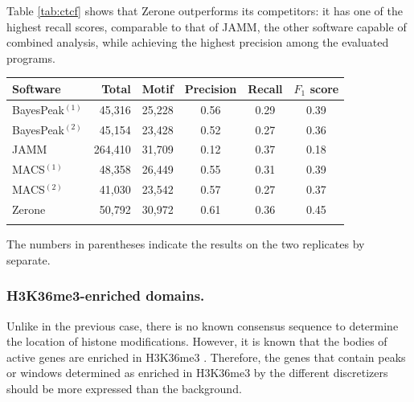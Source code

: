 \documentclass{bioinfo}
\begin{document}
Table \ref{tab:ctcf} shows that Zerone outperforms its competitors: it
has one of the highest recall scores, comparable to that of JAMM, the
other software capable of combined analysis, while achieving the
highest precision among the evaluated programs.

\begin{table}[!t]
{\begin{tabular}{lrrccc}
        \toprule
        \textbf{Software}  & \textbf{Total}  & \textbf{Motif} &
        \textbf{Precision} & \textbf{Recall} & \textbf{$F_{1}$ score} \\
        \midrule
        BayesPeak$^{(1)}$ &  45,316 & 25,228 & 0.56 & 0.29 & 0.39 \\
        BayesPeak$^{(2)}$ &  45,154 & 23,428 & 0.52 & 0.27 & 0.36 \\
        JAMM              & 264,410 & 31,709 & 0.12 & 0.37 & 0.18 \\
        MACS$^{(1)}$      &  48,358 & 26,449 & 0.55 & 0.31 & 0.39 \\
        MACS$^{(2)}$      &  41,030 & 23,542 & 0.57 & 0.27 & 0.37 \\
        Zerone            &  50,792 & 30,972 & 0.61 & 0.36 & 0.45 \\
        \botrule
\end{tabular}}{The numbers in parentheses indicate the results on the two
replicates by separate.}
\end{table}

\subsubsection{H3K36me3-enriched domains.}
Unlike in the previous case, there is no known consensus sequence to determine
the location of histone modifications. However, it is known that the bodies of
active genes are enriched in H3K36me3 \citep{pmid16122420,pmid23739122}.
Therefore, the genes that contain peaks or windows determined as enriched in
H3K36me3 by the different discretizers should be more expressed than the
background.
\end{document}
